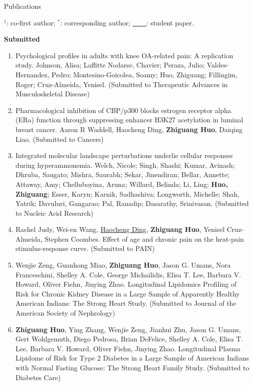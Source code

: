 \documentclass{resume} %
\begin{document}
\begin{rSection}{Publications}

$^\dagger$: co-first author; $^*$: corresponding author; \underline{\mbox{ }\mbox{ }\mbox{ }\mbox{ }}: student paper.

\textbf{Submitted}
\begin{enumerate}[noitemsep,topsep=0pt]

\item
Psychological profiles in adults with knee OA-related pain: A replication study.
Johnson, Alisa; Laffitte Nodarse, Chavier; Peraza, Julio; Valdes-Hernandez, Pedro; Montesino-Goicolea, Soamy; Huo, Zhiguang; Fillingim, Roger; Cruz-Almeida, Yenisel.
(Submitted to Therapeutic Advances in Musculoskeletal Disease)


\item
Pharmacological inhibition of CBP/p300 blocks estrogen receptor alpha (ERa) function through suppressing enhancer H3K27 acetylation in luminal breast cancer.
Aaron R Waddell, Haocheng Ding, {\bf Zhiguang Huo}, Daiqing Liao. 
(Submitted to Cancers)


\item
Integrated molecular landscape perturbations underlie cellular responses during hyperammonemia.
Welch, Nicole; Singh, Shashi; Kumar, Avinash; Dhruba, Saugato; Mishra, Saurabh; Sekar, Jinendiran; Bellar, Annette; Attaway, Amy; Chelluboyina, Aruna; Willard, Belinda; Li, Ling; {\bf Huo, Zhiguang}; Esser, Karyn; Karnik, Sadhashiva; Longworth, Michelle; Shah, Yatrik; Davuluri, Gangarao; Pal, Ranadip; Dasarathy, Srinivasan.
(Submitted to Nucleic Acid Research)



\item
Rachel Judy, Wei-en Wang, \underline{Haocheng Ding}, {\bf Zhiguang Huo}, Yenisel Cruz-Almeida, Stephen Coombes.
Effect of age and chronic pain on the heat-pain stimulus-response curve.
(Submitted to PAIN)


\item
Wenjie Zeng, Guanhong Miao, {\bf Zhiguang Huo}, Jason G. Umans, Nora Franceschini, Shelley A. Cole, George Michailidis, Elisa T. Lee, Barbara V. Howard, Oliver Fiehn, Jinying Zhao.
Longitudinal Lipidomics Profiling of Risk for Chronic Kidney Disease in a Large Sample of Apparently Healthy American Indians: The Strong Heart Study.
(Submitted to Journal of the American Society of Nephrology)

\item
{\bf Zhiguang Huo}, Ying Zhang, Wenjie Zeng, Jianhui Zhu, Jason G. Umans, Gert Wohlgemuth, Diego Pedrosa, Brian DeFelice, Shelley A. Cole, Elisa T. Lee, Barbara V. Howard, Oliver Fiehn, Jinying Zhao.
Longitudinal Plasma Lipidome of Risk for Type 2 Diabetes in a Large Sample of American Indians with Normal Fasting Glucose: The Strong Heart Family Study. 
(Submitted to Diabetes Care)





\end{enumerate}
\end{rSection}
\end{document}
